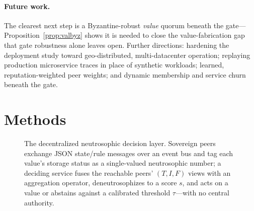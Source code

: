 \documentclass[11pt]{article}
\begin{document}
\paragraph{Future work.} The clearest next step is a Byzantine-robust \emph{value} quorum beneath the
gate---Proposition~\ref{prop:valbyz} shows it is needed to close the value-fabrication gap that gate
robustness alone leaves open. Further directions: hardening the deployment study toward geo-distributed,
multi-datacenter operation; replaying production microservice traces in place of synthetic workloads;
learned, reputation-weighted peer weights; and dynamic membership and service churn beneath the gate.

\section{Methods}
\label{sec:methods}

\begin{figure}[t]
\centering
{}
\caption{The decentralized neutrosophic decision layer. Sovereign peers exchange JSON state/rule
messages over an event bus and tag each value's storage status as a single-valued neutrosophic number;
a deciding service fuses the reachable peers' $(T,I,F)$ views with an aggregation operator,
deneutrosophizes to a score $s$, and acts on a value or abstains against a calibrated threshold
$\tau$---with no central authority.}
\label{fig:system}
\end{figure}
\end{document}

